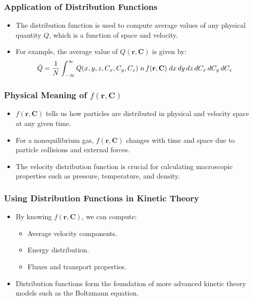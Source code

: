 \documentclass{beamer}
\begin{document}
\begin{frame}
\frametitle{Application of Distribution Functions}
\begin{itemize}
    \item The distribution function is used to compute average values of any physical quantity $Q$, which is a function of space and velocity.
    \item For example, the average value of $Q(\mathbf{r}, \mathbf{C})$ is given by:
    \[
    \bar{Q} = \frac{1}{N} \int_{-\infty}^{\infty}  Q(x, y, z, C_x, C_y, C_z) \; n \, f ({\bf r}, {\bf C})\; dx\,dy\,dz\,dC_x\,dC_y\,dC_z
    \]
\end{itemize}
\end{frame}

\begin{frame}
\frametitle{Physical Meaning of $f(\mathbf{r}, \mathbf{C})$}
\begin{itemize}
    \item $f(\mathbf{r}, \mathbf{C})$ tells us how particles are distributed in physical and velocity space at any given time.
    \item For a nonequilibrium gas, $f(\mathbf{r}, \mathbf{C})$ changes with time and space due to particle collisions and external forces.
    \item The velocity distribution function is crucial for calculating macroscopic properties such as pressure, temperature, and density.
\end{itemize}
\end{frame}

\begin{frame}
\frametitle{Using Distribution Functions in Kinetic Theory}
\begin{itemize}
    \item By knowing $f(\mathbf{r}, \mathbf{C})$, we can compute:
    \begin{itemize}
        \item Average velocity components.
        \item Energy distribution.
        \item Fluxes and transport properties.
    \end{itemize}
    \item Distribution functions form the foundation of more advanced kinetic theory models such as the Boltzmann equation.
\end{itemize}
\end{frame}
\end{document}
